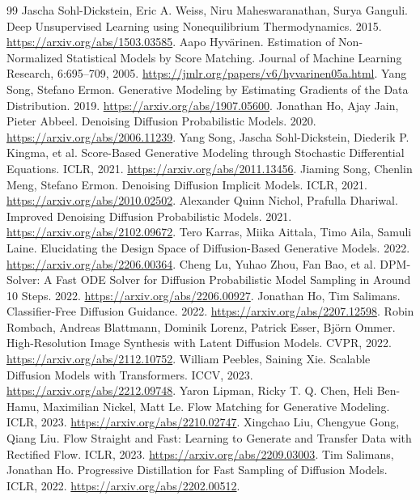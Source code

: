\documentclass[UTF8,12pt,a4paper,fontset=fandol]{ctexart}
\begin{document}
\begin{thebibliography}{99}
 Jascha Sohl-Dickstein, Eric A. Weiss, Niru Maheswaranathan, Surya Ganguli. Deep Unsupervised Learning using Nonequilibrium Thermodynamics. 2015. \url{https://arxiv.org/abs/1503.03585}.
 Aapo Hyv\"arinen. Estimation of Non-Normalized Statistical Models by Score Matching. Journal of Machine Learning Research, 6:695--709, 2005. \url{https://jmlr.org/papers/v6/hyvarinen05a.html}.
 Yang Song, Stefano Ermon. Generative Modeling by Estimating Gradients of the Data Distribution. 2019. \url{https://arxiv.org/abs/1907.05600}.
 Jonathan Ho, Ajay Jain, Pieter Abbeel. Denoising Diffusion Probabilistic Models. 2020. \url{https://arxiv.org/abs/2006.11239}.
 Yang Song, Jascha Sohl-Dickstein, Diederik P. Kingma, et al. Score-Based Generative Modeling through Stochastic Differential Equations. ICLR, 2021. \url{https://arxiv.org/abs/2011.13456}.
 Jiaming Song, Chenlin Meng, Stefano Ermon. Denoising Diffusion Implicit Models. ICLR, 2021. \url{https://arxiv.org/abs/2010.02502}.
 Alexander Quinn Nichol, Prafulla Dhariwal. Improved Denoising Diffusion Probabilistic Models. 2021. \url{https://arxiv.org/abs/2102.09672}.
 Tero Karras, Miika Aittala, Timo Aila, Samuli Laine. Elucidating the Design Space of Diffusion-Based Generative Models. 2022. \url{https://arxiv.org/abs/2206.00364}.
 Cheng Lu, Yuhao Zhou, Fan Bao, et al. DPM-Solver: A Fast ODE Solver for Diffusion Probabilistic Model Sampling in Around 10 Steps. 2022. \url{https://arxiv.org/abs/2206.00927}.
 Jonathan Ho, Tim Salimans. Classifier-Free Diffusion Guidance. 2022. \url{https://arxiv.org/abs/2207.12598}.
 Robin Rombach, Andreas Blattmann, Dominik Lorenz, Patrick Esser, Bj\"orn Ommer. High-Resolution Image Synthesis with Latent Diffusion Models. CVPR, 2022. \url{https://arxiv.org/abs/2112.10752}.
 William Peebles, Saining Xie. Scalable Diffusion Models with Transformers. ICCV, 2023. \url{https://arxiv.org/abs/2212.09748}.
 Yaron Lipman, Ricky T. Q. Chen, Heli Ben-Hamu, Maximilian Nickel, Matt Le. Flow Matching for Generative Modeling. ICLR, 2023. \url{https://arxiv.org/abs/2210.02747}.
 Xingchao Liu, Chengyue Gong, Qiang Liu. Flow Straight and Fast: Learning to Generate and Transfer Data with Rectified Flow. ICLR, 2023. \url{https://arxiv.org/abs/2209.03003}.
 Tim Salimans, Jonathan Ho. Progressive Distillation for Fast Sampling of Diffusion Models. ICLR, 2022. \url{https://arxiv.org/abs/2202.00512}.

\end{thebibliography}
\end{document}
